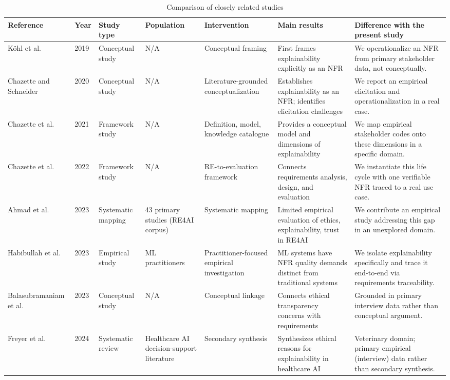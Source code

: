 \documentclass[pdflatex,sn-mathphys-num,Numbered]{sn-jnl}
\begin{document}
\begin{table}
\caption{Comparison of closely related studies}
\label{tab1}
\centering
\footnotesize
\setlength{\tabcolsep}{3pt}
\renewcommand{\arraystretch}{1.05}
\begin{tabular}{@{}L{2.1cm}L{0.6cm}L{1.5cm}L{2.5cm}L{2.8cm}L{3.9cm}L{3.6cm}@{}}
\toprule
Reference & Year & Study type & Population & Intervention & Main results & Difference with the present study \\
\midrule
Köhl et al.~\cite{kohl2019} & 2019 & Conceptual study & N/A & Conceptual framing & First frames explainability explicitly as an NFR & We operationalize an NFR from primary stakeholder data, not conceptually. \\
Chazette and Schneider~\cite{chazette2020} & 2020 & Conceptual study & N/A & Literature-grounded conceptualization & Establishes explainability as an NFR; identifies elicitation challenges & We report an empirical elicitation and operationalization in a real case. \\
Chazette et al.~\cite{chazette2021} & 2021 & Framework study & N/A & Definition, model, knowledge catalogue & Provides a conceptual model and dimensions of explainability & We map empirical stakeholder codes onto these dimensions in a specific domain. \\
Chazette et al.~\cite{chazette2022} & 2022 & Framework study & N/A & RE-to-evaluation framework & Connects requirements analysis, design, and evaluation & We instantiate this life cycle with one verifiable NFR traced to a real use case. \\
Ahmad et al.~\cite{ahmad2023} & 2023 & Systematic mapping & 43 primary studies (RE4AI corpus) & Systematic mapping & Limited empirical evaluation of ethics, explainability, trust in RE4AI & We contribute an empirical study addressing this gap in an unexplored domain. \\
Habibullah et al.~\cite{habibullah2023} & 2023 & Empirical study & ML practitioners & Practitioner-focused empirical investigation & ML systems have NFR quality demands distinct from traditional systems & We isolate explainability specifically and trace it end-to-end via requirements traceability. \\
Balasubramaniam et al.~\cite{balasubramaniam2023} & 2023 & Conceptual study & N/A & Conceptual linkage & Connects ethical transparency concerns with requirements & Grounded in primary interview data rather than conceptual argument. \\
Freyer et al.~\cite{freyer2024} & 2024 & Systematic review & Healthcare AI decision-support literature & Secondary synthesis & Synthesizes ethical reasons for explainability in healthcare AI & Veterinary domain; primary empirical (interview) data rather than secondary synthesis. \\

\end{tabular}
\end{table}
\end{document}
